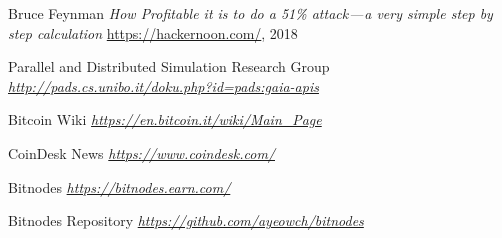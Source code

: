 \begin{thebibliography}{99}
 Bruce Feynman
{\em How Profitable it is to do a 51\% attack — a very simple step by step calculation}
\url{https://hackernoon.com/}, 2018

 Parallel and Distributed Simulation Research Group
{\em \url{http://pads.cs.unibo.it/doku.php?id=pads:gaia-apis}}

 Bitcoin Wiki
{\em \url{https://en.bitcoin.it/wiki/Main_Page}}

 CoinDesk News
{\em \url{https://www.coindesk.com/}}

 Bitnodes
{\em \url{https://bitnodes.earn.com/}}

 Bitnodes Repository
{\em \url{https://github.com/ayeowch/bitnodes}}

\end{thebibliography}


